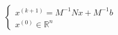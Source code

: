 \begin{equation*}
    \begin{cases}
       x^{(k+1)} = M^{-1}Nx + M^{-1}b\\
       x^{(0)} \in \mathbb{R}^n
    \end{cases}
\end{equation*}
